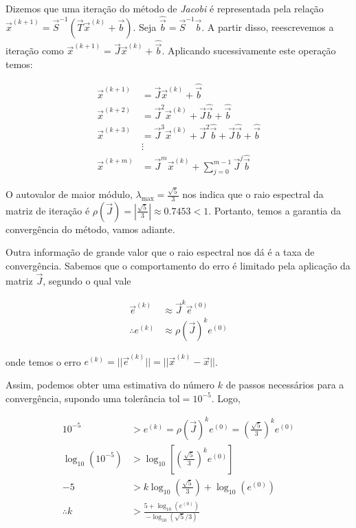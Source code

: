 \documentclass{homework}
\begin{document}
\begin{enumerate}[wide, leftmargin=80pt]
			Dizemos que uma iteração do método de \textit{Jacobi} é representada pela relação $\vec{x}^{(k+1)} = \vec{S}^{-1}\left(\vec{T}\vec{x}^{(k)} + \vec{b}\right)$. Seja $\hat{\vec{b}} = \vec{S}^{-1}\vec{b}$. A partir disso, reescrevemos a iteração como $\vec{x}^{(k+1)} = \vec{J} \vec{x}^{(k)} + \hat{\vec{b}}$. Aplicando sucessivamente este operação temos:
			
			\begin{align*}
				\vec{x}^{(k+1)} &= \vec{J} \vec{x}^{(k)} + \hat{\vec{b}}\\
				\vec{x}^{(k+2)} &= \vec{J}^{2} \vec{x}^{(k)} + \vec{J}\hat{\vec{b}} + \hat{\vec{b}}\\
				\vec{x}^{(k+3)} &= \vec{J}^{3} \vec{x}^{(k)} + \vec{J}^{2} \hat{\vec{b}} + \vec{J}\hat{\vec{b}} + \hat{\vec{b}}\\
				&\vdots\\
				\vec{x}^{(k+m)} &= \vec{J}^{m} \vec{x}^{(k)} + \sum_{j=0}^{m-1} \vec{J}^{j}\hat{\vec{b}}
			\end{align*}
			
			O autovalor de maior módulo, $\lambda_\text{max} = \frac{\sqrt{5}}{3}$ nos indica que o raio espectral da matriz de iteração é $\rho\left(\vec{J}\right) = |\frac{\sqrt{5}}{3}| \approx 0.7453 < 1$. Portanto, temos a garantia da convergência do método, vamos adiante.\par
		
			
			Outra informação de grande valor que o raio espectral nos dá é a taxa de convergência. Sabemos que o comportamento do erro é limitado pela aplicação da matriz $\vec{J}$, segundo o qual vale
			
			\begin{align*}	
				\vec{e}^{(k)} &\approx \vec{J}^{k} \vec{e}^{(0)}\\
				\therefore e^{(k)} &\approx \rho\left(\vec{J}\right)^{k} e^{(0)}
			\end{align*}
			
			onde temos o erro $e^{(k)} = ||\vec{e}^{(k)}|| = ||\vec{x}^{(k)} - \vec{x}||$.\par
			
			Assim, podemos obter uma estimativa do número $k$ de passos necessários para a convergência, supondo uma tolerância $\text{tol} = 10^{-5}$. Logo,
			
			\begin{align*}
				10^{-5} &> e^{(k)} = \rho\left(\vec{J}\right)^{k} e^{(0)} =  \left(\frac{\sqrt{5}}{3}\right)^{k} e^{(0)}\\
				\log_{10}\left(10^{-5}\right) &> \log_{10}\left[\left(\frac{\sqrt{5}}{3}\right)^{k} e^{(0)}\right]\\
				-5 &> k \log_{10}\left(\frac{\sqrt{5}}{3}\right) + \log_{10}\left(e^{(0)}\right)\\
				\therefore k &> \frac{5 + \log_{10}\left(e^{(0)}\right)}{- \log_{10}\left(\sqrt{5}/3\right)}
			\end{align*}
			

\end{enumerate}
\end{document}
